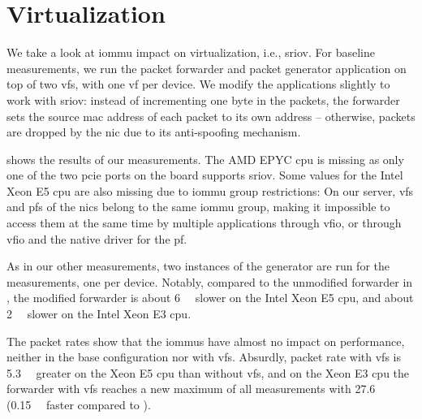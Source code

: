 \section{Virtualization}
\label{sec:virtualization}

We take a look at \ac{iommu} impact on virtualization, i.e., \ac{sriov}. For
baseline measurements, we run the packet forwarder and packet generator
application on top of two \acp{vf}, with one \ac{vf} per device. We modify the
applications slightly to work with \ac{sriov}: instead of incrementing one byte
in the packets, the forwarder sets the source \ac{mac} address of each packet to
its own address -- otherwise, packets are dropped by the \ac{nic} due to its
anti-spoofing mechanism.

 shows the results of our measurements. The AMD EPYC
\ac{cpu} is missing as only one of the two \ac{pcie} ports on the board supports
\ac{sriov}. Some values for the Intel Xeon E5 \ac{cpu} are also missing due to
\ac{iommu} group restrictions: On our server, \acp{vf} and \acp{pf} of the
\acp{nic} belong to the same \ac{iommu} group, making it impossible to access
them at the same time by multiple applications through \ac{vfio}, or through
\ac{vfio} and the native driver for the \ac{pf}.

As in our other measurements, two instances of the generator are run for the
measurements, one per device. Notably, compared to the unmodified forwarder in
, the modified forwarder is about
\SI{6}{\mega\pps} slower on the Intel Xeon E5 \ac{cpu}, and about
\SI{2}{\mega\pps} slower on the Intel Xeon E3 \ac{cpu}.

The packet rates show that the \acp{iommu} have almost no impact on performance,
neither in the base configuration nor with \acp{vf}. Absurdly, packet rate with
\acp{vf} is \SI{5.3}{\mega\pps} greater on the Xeon E5 \ac{cpu} than without
\acp{vf}, and on the Xeon E3 \ac{cpu} the forwarder with \acp{vf} reaches a new
maximum of all measurements with \SI{27.6}{\mega\pps} (\SI{0.15}{\mega\pps}
faster compared to ).

